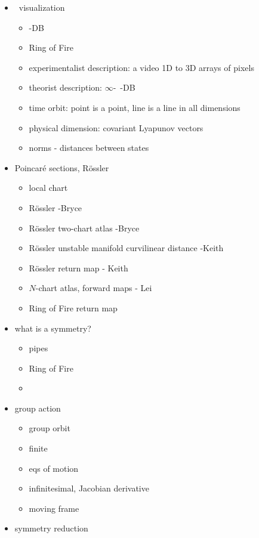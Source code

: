 \begin{itemize}
  \item \statesp\ visualization
    \begin{itemize}
      \item \cLe -DB
      \item Ring of Fire
      \item experimentalist description: a video 1D to 3D arrays of pixels
      \item theorist description: $\infty$-\dmn\ \statesp -DB
      \item time orbit: point is a point, line is a line in all dimensions
      \item physical dimension: covariant Lyapunov vectors
      \item norms - distances between states
    \end{itemize}
  \item Poincar\'e sections, R\"ossler
    \begin{itemize}
      \item local chart
      \item R\"ossler {\poincBord} -Bryce
      \item R\"ossler two-chart atlas -Bryce
      \item R\"ossler unstable manifold curvilinear distance -Keith
      \item R\"ossler return map - Keith
      \item $N$-chart atlas, forward maps - Lei
      \item Ring of Fire return map
    \end{itemize}
  \item what is a symmetry?
    \begin{itemize}
      \item pipes
      \item Ring of Fire
      \item \cLe
    \end{itemize}
  \item group action
    \begin{itemize}
      \item group orbit
      \item finite
      \item eqs of motion
      \item infinitesimal, Jacobian derivative
      \item moving frame
    \end{itemize}
  \item symmetry reduction

\end{itemize}
